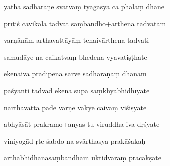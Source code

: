 \documentclass[article,12pt,a4paper]{memoir}%
\newcounter{parCount}
\begin{document}
	  
	  \pstart {} yathā sādhāraṇe svatvaṃ tyāgasya ca phalaṃ dhane 
	{}
	\pend%
      

	  
	  \pstart \leavevmode%
	prītiś cāvikalā tadvat saṃbandho+arthena tadvatām 
	{}
	\pend%
      

	  
	  \pstart {} varṇānām arthavattāyāṃ tenaivārthena tadvati 
	{}
	\pend%
      

	  
	  \pstart \leavevmode%
	samudāye na caikatvaṃ bhedena vyavatiṣṭhate 
	{}
	\pend%
      

	  
	  \pstart {} ekenaiva pradīpena sarve sādhāraṇaṃ dhanam 
	{}
	\pend%
      

	  
	  \pstart \leavevmode%
	paśyanti tadvad ekena supā saṃkhyābhidhīyate 
	{}
	\pend%
      

	  
	  \pstart {} nārthavattā pade varṇe vākye caivaṃ viśiṣyate 
	{}
	\pend%
      

	  
	  \pstart \leavevmode%
	abhyāsāt prakramo+anyas tu viruddha iva dṛśyate 
	{}
	\pend%
      

	  
	  \pstart {} viniyogād ṛte śabdo na svārthasya prakāśakaḥ 
	{}
	\pend%
      

	  
	  \pstart \leavevmode%
	arthābhidhānasaṃbandham uktidvāraṃ pracakṣate 
	{}
	\pend%
      
\end{document}
